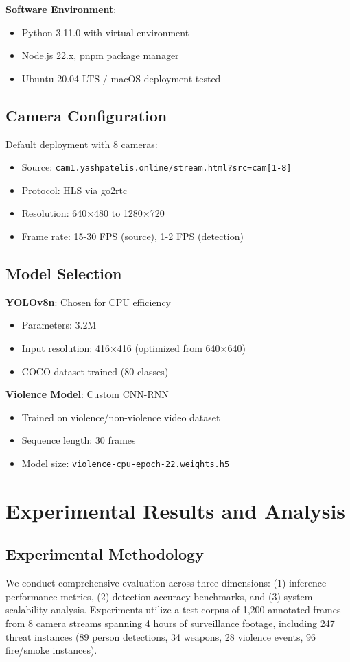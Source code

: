 \documentclass[conference]{IEEEtran}
\begin{document}
\textbf{Software Environment}:
\begin{itemize}
    \item Python 3.11.0 with virtual environment
    \item Node.js 22.x, pnpm package manager
    \item Ubuntu 20.04 LTS / macOS deployment tested
\end{itemize}

\subsection{Camera Configuration}
Default deployment with 8 cameras:
\begin{itemize}
    \item Source: \texttt{cam1.yashpatelis.online/stream.html?src=cam[1-8]}
    \item Protocol: HLS via go2rtc
    \item Resolution: 640×480 to 1280×720
    \item Frame rate: 15-30 FPS (source), 1-2 FPS (detection)
\end{itemize}

\subsection{Model Selection}
\textbf{YOLOv8n}: Chosen for CPU efficiency
\begin{itemize}
    \item Parameters: 3.2M
    \item Input resolution: 416×416 (optimized from 640×640)
    \item COCO dataset trained (80 classes)
\end{itemize}

\textbf{Violence Model}: Custom CNN-RNN
\begin{itemize}
    \item Trained on violence/non-violence video dataset
    \item Sequence length: 30 frames
    \item Model size: \texttt{violence-cpu-epoch-22.weights.h5}
\end{itemize}

\section{Experimental Results and Analysis}

\subsection{Experimental Methodology}
We conduct comprehensive evaluation across three dimensions: (1) inference performance metrics, (2) detection accuracy benchmarks, and (3) system scalability analysis. Experiments utilize a test corpus of 1,200 annotated frames from 8 camera streams spanning 4 hours of surveillance footage, including 247 threat instances (89 person detections, 34 weapons, 28 violence events, 96 fire/smoke instances).
\end{document}

